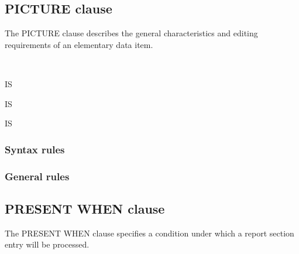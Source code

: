 \subsection{PICTURE clause}

The PICTURE clause describes the general characteristics and editing requirements of an elementary data item.

\begin{syntax}
  \begin{1=}
     \\
  \end{1=}
  IS 
  \begin{0-1}
    \begin{0-1}
      IS 
    \end{0-1}
     IS \integer
  \end{0-1}
\end{syntax}

\subsubsection{Syntax rules}

\subsubsection{General rules}

\subsection{PRESENT WHEN clause}

The PRESENT WHEN clause specifies a condition under which a report section entry will be processed.

